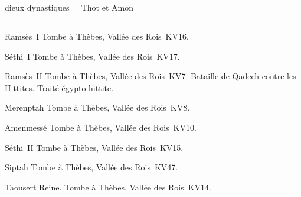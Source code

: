 dieux dynastiques = Thot et Amon

\subsection{\texorpdfstring{}{XIXe dynastie}}


\begin{listerois}
  \item [Ramsès~I\ier \datation{(c.~1292-1290)}] 
        Tombe à Thèbes, Vallée des Rois~KV16. 
  \item [Séthi~I\ier \datation{(c.~1290-1279)}] 
        Tombe à Thèbes, Vallée des Rois~KV17. 
  \item [Ramsès~II \datation{(c.~1279-1213)}] 
        Tombe à Thèbes, Vallée des Rois~KV7. Bataille de Qadech 
        contre les Hittites. Traité égypto-hittite.
  \item [Merenptah \datation{(c.~1213-1203)}] 
        Tombe à Thèbes, Vallée des Rois~KV8. 
  \item [Amenmessé \datation{(c.~1203-1199)}] 
        Tombe à Thèbes, Vallée des Rois~KV10. 
  \item [Séthi~II \datation{(c.~1199-1193)}] 
        Tombe à Thèbes, Vallée des Rois~KV15. 
  \item [Siptah \datation{(c.~1193-1187)}] 
        Tombe à Thèbes, Vallée des Rois~KV47. 
  \item [Taousert \datation{(c.~1187-1185)}] Reine.
        Tombe à Thèbes, Vallée des Rois~KV14. 
\end{listerois}

\subsection{\texorpdfstring{}{XXe dynastie}}


